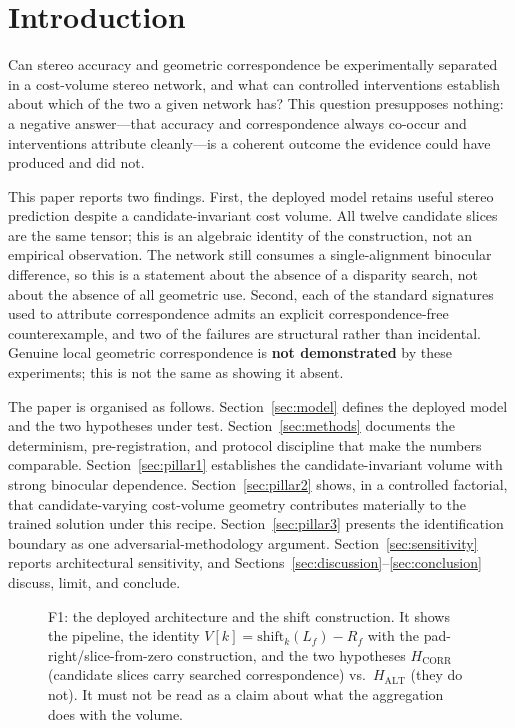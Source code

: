 \documentclass[conference]{IEEEtran}
\begin{document}
\section{Introduction}
\label{sec:intro}

Can stereo accuracy and geometric correspondence be experimentally separated in a cost-volume stereo network, and what can controlled interventions establish about which of the two a given network has? This question presupposes nothing: a negative answer---that accuracy and correspondence always co-occur and interventions attribute cleanly---is a coherent outcome the evidence could have produced and did not.

This paper reports two findings. First, the deployed model retains useful stereo prediction despite a candidate-invariant cost volume. All twelve candidate slices are the same tensor; this is an algebraic identity of the construction, not an empirical observation. The network still consumes a single-alignment binocular difference, so this is a statement about the absence of a disparity search, not about the absence of all geometric use. Second, each of the standard signatures used to attribute correspondence admits an explicit correspondence-free counterexample, and two of the failures are structural rather than incidental. Genuine local geometric correspondence is \textbf{not demonstrated} by these experiments; this is not the same as showing it absent.

The paper is organised as follows. Section~\ref{sec:model} defines the deployed model and the two hypotheses under test. Section~\ref{sec:methods} documents the determinism, pre-registration, and protocol discipline that make the numbers comparable. Section~\ref{sec:pillar1} establishes the candidate-invariant volume with strong binocular dependence. Section~\ref{sec:pillar2} shows, in a controlled factorial, that candidate-varying cost-volume geometry contributes materially to the trained solution under this recipe. Section~\ref{sec:pillar3} presents the identification boundary as one adversarial-methodology argument. Section~\ref{sec:sensitivity} reports architectural sensitivity, and Sections~\ref{sec:discussion}--\ref{sec:conclusion} discuss, limit, and conclude.

\begin{figure}[t]
\centering
{}
\caption{F1: the deployed architecture and the shift construction. It shows the pipeline, the identity $V[k]=\mathrm{shift}_k(L_f)-R_f$ with the pad-right/slice-from-zero construction, and the two hypotheses $H_{\mathrm{CORR}}$ (candidate slices carry searched correspondence) vs.\ $H_{\mathrm{ALT}}$ (they do not). It must not be read as a claim about what the aggregation does with the volume.}
\label{fig:f1}
\end{figure}
\end{document}
